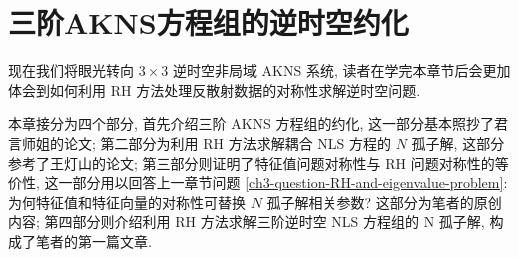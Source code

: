 \chapter{三阶AKNS方程组的逆时空约化}
现在我们将眼光转向 $ 3 \times 3 $ 逆时空非局域 AKNS 系统, 读者在学完本章节后会更加体会到如何利用 RH 方法处理反散射数据的对称性求解逆时空问题.

本章接分为四个部分, 首先介绍三阶 AKNS 方程组的约化, 这一部分基本照抄了君言师姐的论文; 第二部分为利用 RH 方法求解耦合 NLS 方程的 $N$ 孤子解, 这部分参考了王灯山的论文\cite{Wang2010JMP}; 第三部分则证明了特征值问题对称性与 RH 问题对称性的等价性, 这一部分用以回答上一章节问题 \ref{ch3-question-RH-and-eigenvalue-problem}: 为何特征值和特征向量的对称性可替换 $N$ 孤子解相关参数? 这部分为笔者的原创内容; 第四部分则介绍利用 RH 方法求解三阶逆时空 NLS 方程组的 N 孤子解, 构成了笔者的第一篇文章.

